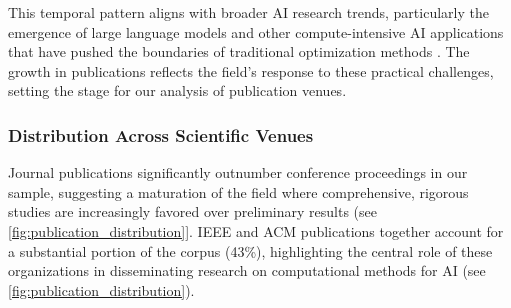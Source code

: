 \documentclass[acmsmall]{acmart}
\begin{document}
This temporal pattern aligns with broader AI research trends, particularly the emergence of large language models and other compute-intensive AI applications that have pushed the boundaries of traditional optimization methods \citep{ataei2024filtering}. The growth in publications reflects the field's response to these practical challenges, setting the stage for our analysis of publication venues.

\subsubsection{Distribution Across Scientific Venues}\label{subsubsec:overview-of-included-studies:distribution-across-scientific-venues}
Journal publications significantly outnumber conference proceedings in our sample, suggesting a maturation of the field where comprehensive, rigorous studies are increasingly favored over preliminary results (see \cref{fig:publication_distribution}]. IEEE and ACM publications together account for a substantial portion of the corpus (43\%), highlighting the central role of these organizations in disseminating research on computational methods for AI (see \cref{fig:publication_distribution}).
\end{document}
